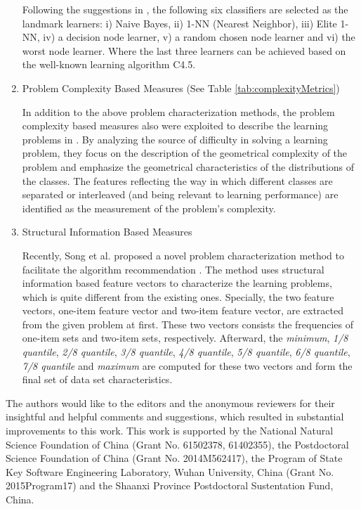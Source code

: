 \documentclass[prodmode,acmtkdd]{acmsmall}
\begin{document}
\begin{enumerate}
    \quad Following the suggestions in
    \cite{Pfahringer00meta,Bensusan2000casa}, the following six classifiers are
    selected as the landmark learners: i) Naive Bayes, ii) 1-NN (Nearest Neighbor),
    iii) Elite 1-NN, iv) a decision node learner, v)
    a random chosen node learner and  vi) the worst node learner.
    Where the last three learners can be achieved based on the
    well-known learning algorithm C4.5.

    \item {Problem Complexity Based Measures} (See Table
    \ref{tab:complexityMetrics})

    In addition to the above problem characterization methods, the
    problem complexity based measures also were exploited to describe
    the learning problems in
    \cite{bernado2005domain,ho2002complexity,elizondo2009estimation,ho2000complexity}.
    By analyzing the source of difficulty in solving a learning problem,
    they focus on the description of the geometrical complexity of the
    problem and emphasize the geometrical characteristics of the
    distributions of the classes. The features reflecting the way in
    which different classes are separated or interleaved (and being
    relevant to learning performance) are identified as the measurement
    of the problem's complexity.

    \item {Structural Information Based Measures}

    Recently, Song et al. proposed a novel problem characterization
    method to facilitate the algorithm recommendation
    \cite{song2012automatic}. The method uses structural information
    based feature vectors to characterize the learning problems, which
    is quite different from the existing ones. Specially, the two
    feature vectors, one-item feature vector and two-item feature
    vector, are extracted from the given problem at first. These two vectors
    consists the frequencies of one-item sets and two-item sets,
    respectively. Afterward, the \emph{minimum}, \emph{1/8
    quantile}, \emph{2/8 quantile}, \emph{3/8 quantile}, \emph{4/8
    quantile}, \emph{5/8 quantile}, \emph{6/8 quantile}, \emph{7/8
    quantile} and \emph{maximum} are computed for these two vectors
    and form the final set of data set characteristics.
\end{enumerate}

\begin{acks}
The authors would like to the editors and the anonymous reviewers for their insightful and helpful comments and suggestions, which resulted in substantial improvements to this work. This work is supported by the National Natural Science Foundation of China (Grant No. 61502378, 61402355), the Postdoctoral Science Foundation of China (Grant No. 2014M562417), the Program of State Key Software Engineering Laboratory, Wuhan University, China (Grant No. 2015Program17) and the Shaanxi Province Postdoctoral Sustentation Fund, China.
\end{acks}
\end{document}

